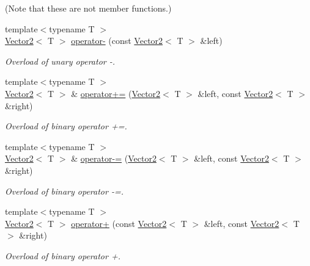 (Note that these are not member functions.) \begin{DoxyCompactItemize}
\item 
{\footnotesize template$<$typename T $>$ }\\\hyperlink{class_triton_1_1_util_1_1_vector2}{Vector2}$<$ T $>$ \hyperlink{class_triton_1_1_util_1_1_vector2_a3e0f93634ae76fec7f94ca462c2f41a5}{operator-\/} (const \hyperlink{class_triton_1_1_util_1_1_vector2}{Vector2}$<$ T $>$ \&left)
\begin{DoxyCompactList}\small\item\em Overload of unary operator -\/. \end{DoxyCompactList}\item 
{\footnotesize template$<$typename T $>$ }\\\hyperlink{class_triton_1_1_util_1_1_vector2}{Vector2}$<$ T $>$ \& \hyperlink{class_triton_1_1_util_1_1_vector2_ad4b7a9d355d57790bfc7df0ade8bb628}{operator+=} (\hyperlink{class_triton_1_1_util_1_1_vector2}{Vector2}$<$ T $>$ \&left, const \hyperlink{class_triton_1_1_util_1_1_vector2}{Vector2}$<$ T $>$ \&right)
\begin{DoxyCompactList}\small\item\em Overload of binary operator +=. \end{DoxyCompactList}\item 
{\footnotesize template$<$typename T $>$ }\\\hyperlink{class_triton_1_1_util_1_1_vector2}{Vector2}$<$ T $>$ \& \hyperlink{class_triton_1_1_util_1_1_vector2_a30a5a12ad03c9a3a982a0a313bf84e6f}{operator-\/=} (\hyperlink{class_triton_1_1_util_1_1_vector2}{Vector2}$<$ T $>$ \&left, const \hyperlink{class_triton_1_1_util_1_1_vector2}{Vector2}$<$ T $>$ \&right)
\begin{DoxyCompactList}\small\item\em Overload of binary operator -\/=. \end{DoxyCompactList}\item 
{\footnotesize template$<$typename T $>$ }\\\hyperlink{class_triton_1_1_util_1_1_vector2}{Vector2}$<$ T $>$ \hyperlink{class_triton_1_1_util_1_1_vector2_a72421239823c38a6b780c86a710ead07}{operator+} (const \hyperlink{class_triton_1_1_util_1_1_vector2}{Vector2}$<$ T $>$ \&left, const \hyperlink{class_triton_1_1_util_1_1_vector2}{Vector2}$<$ T $>$ \&right)
\begin{DoxyCompactList}\small\item\em Overload of binary operator +. \end{DoxyCompactList}\item 

\end{DoxyCompactItemize}
